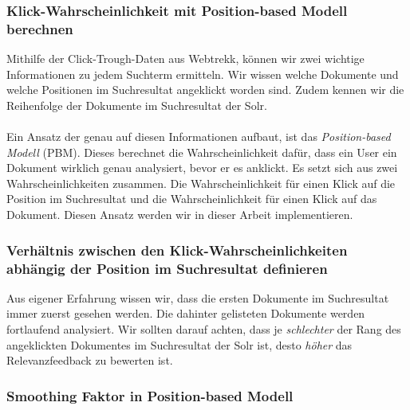 \subsubsection{Klick-Wahrscheinlichkeit mit Position-based Modell berechnen}
\label{sec:Einfuehrung:Methodik:SucheEinbinden:PBM}

Mithilfe der Click-Trough-Daten aus Webtrekk, können wir zwei wichtige Informationen zu jedem Suchterm ermitteln. Wir wissen welche Dokumente und welche Positionen im Suchresultat angeklickt worden sind. Zudem kennen wir die Reihenfolge der Dokumente im Suchresultat der Solr.
\\
\\
Ein Ansatz der genau auf diesen Informationen aufbaut, ist das \textit{Position-based Modell} (PBM)\cite{pbm}. Dieses berechnet die Wahrscheinlichkeit dafür, dass ein User ein Dokument wirklich genau analysiert, bevor er es anklickt. Es setzt sich aus zwei Wahrscheinlichkeiten zusammen. Die Wahrscheinlichkeit für einen Klick auf die Position im Suchresultat und die Wahrscheinlichkeit für einen Klick auf das Dokument. Diesen Ansatz werden wir in dieser Arbeit implementieren.

\subsubsection{Verhältnis zwischen den Klick-Wahrscheinlichkeiten abhängig der Position im Suchresultat definieren}
\label{sec:Einfuehrung:Methodik:SucheEinbinden:PBM}

Aus eigener Erfahrung wissen wir, dass die ersten Dokumente im Suchresultat immer zuerst gesehen werden. Die dahinter gelisteten Dokumente werden fortlaufend analysiert. Wir sollten darauf achten, dass je \textit{schlechter} der Rang des angeklickten Dokumentes im Suchresultat der Solr ist, desto \textit{höher} das Relevanzfeedback zu bewerten ist.

\subsubsection{Smoothing Faktor in Position-based Modell}
\label{sec:Einfuehrung:Methodik:SucheEinbinden:SmoothingPBM}

